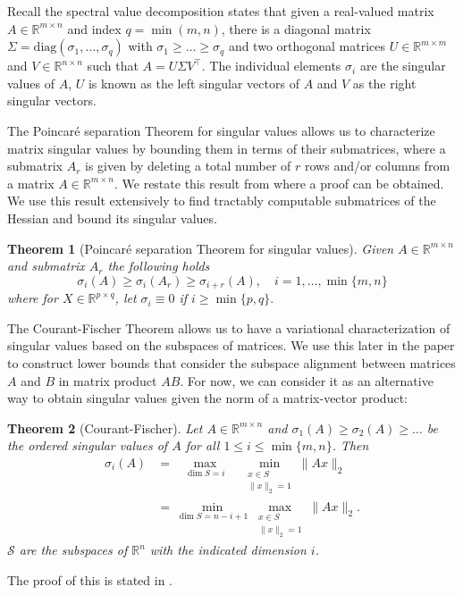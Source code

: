 \documentclass{article}
\theoremstyle{plain}
\newtheorem{theorem}{Theorem}
\theoremstyle{definition}
\theoremstyle{remark}
\begin{document}
Recall the spectral value decomposition states that given a real-valued matrix $A \in \mathbb{R}^{m \times n}$ and index $q = \min(m, n)$, there is a diagonal matrix $\Sigma =\mathrm{diag}(\sigma_1, \ldots, \sigma_q)$ with $\sigma_1 \ge \dots \ge \sigma_q$ and two orthogonal matrices $U \in \mathbb{R}^{m \times m}$ and $V \in \mathbb{R}^{n \times n}$ such that $A = U\Sigma V^{\top}$. The individual elements $\sigma_i$ are the singular values of $A$, $U$ is known as the left singular vectors of $A$ and $V$ as the right singular vectors.

The Poincaré separation Theorem for singular values allows us to characterize matrix singular values by bounding them in terms of their submatrices, where a submatrix $A_r$ is given by deleting a total number of $r$ rows and/or columns from a matrix $A \in \mathbb{R}^{m \times n}$. We restate this result from \citet[3.1.3, p.~149]{Horn_Johnson_1991} where a proof can be obtained. We use this result extensively to find tractably computable submatrices of the Hessian and bound its singular values.

\begin{theorem}[Poincaré separation Theorem for singular values]
\label{thm:poincare-seperation}
Given $A \in \mathbb{R}^{m \times n}$ and submatrix $A_r$ the following holds 
\begin{equation*}
\label{eq:poincare-seperation}
\sigma_i(A) \ge \sigma_i(A_r) \ge \sigma_{i + r}(A), \quad i = 1, \ldots, \min\{m, n\}
\end{equation*}
where for $X \in \mathbb{R}^{p \times q}$, let $\sigma_i \equiv 0$ if $i \ge \min\{p, q\}.$
\end{theorem}

The Courant-Fischer Theorem allows us to have a variational characterization of singular values based on the subspaces of matrices. We use this later in the paper to construct lower bounds that consider the subspace alignment between matrices $A$ and $B$ in matrix product $AB$. For now, we can consider it as an alternative way to obtain singular values given the norm of a matrix-vector product:

\begin{theorem}[Courant-Fischer]
\label{thm:courant-fischer}
Let $A \in \mathbb{R}^{m \times n}$ and $\sigma_1(A) \geq \sigma_2(A) \ge \ldots$ be the ordered singular values of $A$ for all $1 \le i \le \min\{m, n\}$. Then
\begin{align*}
\label{eq:courant-fischer}
\sigma_i(A) &= \ \ \  \underset{\dim S = i}{\max} \quad \underset{
\substack{x \in S \\ \|x\|_2 = 1}
}{\min}  \|Ax\|_2 \\
&= \underset{\dim S = n - i + 1}{\min} \underset{
\substack{x \in S \\ \|x\|_2 = 1}
}{\max}  \|Ax\|_2.
\end{align*}
$\mathcal{S}$ are the subspaces of $\mathbb{R}^n$ with the indicated dimension $i$.
\end{theorem}
The proof of this is stated in \citet[3.1.2]{Horn_Johnson_1991}.
\end{document}
